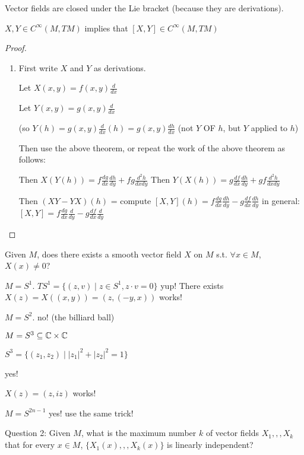 \documentclass[11pt,leqno,oneside]{amsart}
\newenvironment{dateenv}{
	\vspace{1em}
}{
	\vspace{1em}
}
\newcommand{\x}{\times}
\newcommand{\mydate}[4]{
	\newdate{#1}{#2}{#3}{#4}
	\begin{dateenv}
		\hfill\displaydate{#1}
	\end{dateenv}
}
\theoremstyle{mystyle} \newtheorem{thrm}[thm]{Theorem}
\theoremstyle{mystyle} \newtheorem{defi}[thm]{Definition}
\begin{document}
\begin{example}
	Vector fields are closed under the Lie bracket (because they are derivations).

	$X, Y \in C^\infty(M, TM)$ implies that $[X,Y] \in C^\infty(M, TM)$
\end{example}
\begin{proof}
	\begin{enumerate}
		\item
		First write $X$ and $Y$ as derivations.

		Let $X(x,y) = f(x,y)\frac{d}{dx}$

		Let $Y(x,y) = g(x,y)\frac{d}{dx}$

		(so $Y(h) = g(x,y)\frac{d}{dx}(h) = g(x,y)\frac{dh}{dx}$  (not $Y$ OF $h$, but $Y$ applied to $h$)

Then use the above theorem, or repeat the work of the above theorem as follows:

		Then $X(Y(h)) = f \frac{dg}{dx} \frac{dh}{dy} + fg \frac{d^2h}{dxdy}$
		Then $Y(X(h)) = g \frac{df}{dx} \frac{dh}{dy} + gf \frac{d^2h}{dxdy}$

		Then $(XY - YX)(h)$ = compute
		$[X,Y](h) = f \frac{dg}{dx} \frac{dh}{dy} - g \frac{df}{dx} \frac{dh}{dy}$
		in general:
		$[X,Y] = f \frac{dg}{dx} \frac{d}{dy} - g \frac{df}{dx} \frac{d}{dy}$
	\end{enumerate}
\end{proof}

\mydate{d6}{12}{10}{2016}

Given $M$, does there exists a smooth vector field $X$ on $M$ s.t. $\forall x \in M$, $X(x) \neq 0$?

\begin{example}
	$M = S^1$.  $TS^1 = \{ (z,v) \mid z \in S^1, z \cdot v = 0 \}$
	yup!  There exists
	$X(z) = X((x,y)) = (z, (-y,x))$ works!
\end{example}
\begin{example}
	$M = S^2$.
	no! (the billiard ball)
\end{example}
\begin{example}
	$M = S^3 \subseteq \C \x \C$

	$S^3 = \{ (z_1,z_2) \mid |z_1|^2 + |z_2|^2 = 1 \}$

	yes!

	$X(z) = (z, iz)$ works!
\end{example}
\begin{example}
	$M = S^{2n-1}$
	yes!
	use the same trick!
\end{example}
Question 2:
Given $M$, what is the maximum number $k$ of vector fields $X_1,,,X_k$ that for every $x \in M$, $\{X_1(x),,,X_k(x)\}$ is linearly independent?
\end{document}
